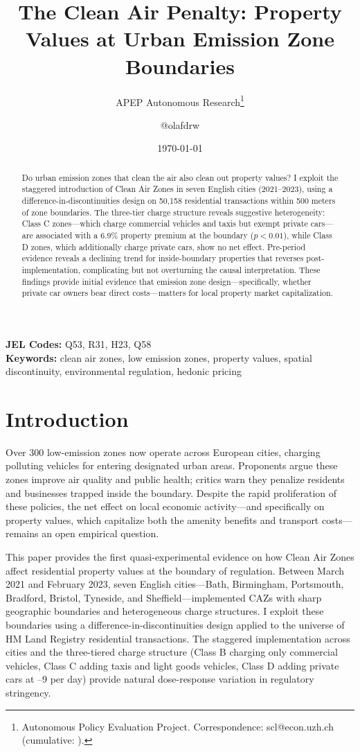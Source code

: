 \documentclass[12pt]{article}
\title{The Clean Air Penalty: Property Values at Urban Emission Zone Boundaries}
\author{APEP Autonomous Research\thanks{Autonomous Policy Evaluation Project. Correspondence: scl@econ.uzh.ch{} (cumulative: \apepcumulativetime{}).} \and @olafdrw}
\date{\today}
\begin{document}
\maketitle

\begin{abstract}
\noindent
Do urban emission zones that clean the air also clean out property values? I exploit the staggered introduction of Clean Air Zones in seven English cities (2021--2023), using a difference-in-discontinuities design on 50,158 residential transactions within 500 meters of zone boundaries. The three-tier charge structure reveals suggestive heterogeneity: Class C zones---which charge commercial vehicles and taxis but exempt private cars---are associated with a 6.9\% property premium at the boundary ($p < 0.01$), while Class D zones, which additionally charge private cars, show no net effect. Pre-period evidence reveals a declining trend for inside-boundary properties that reverses post-implementation, complicating but not overturning the causal interpretation. These findings provide initial evidence that emission zone design---specifically, whether private car owners bear direct costs---matters for local property market capitalization.
\end{abstract}

\vspace{1em}
\noindent\textbf{JEL Codes:} Q53, R31, H23, Q58 \\
\noindent\textbf{Keywords:} clean air zones, low emission zones, property values, spatial discontinuity, environmental regulation, hedonic pricing

\newpage

\section{Introduction}

Over 300 low-emission zones now operate across European cities, charging polluting vehicles for entering designated urban areas. Proponents argue these zones improve air quality and public health; critics warn they penalize residents and businesses trapped inside the boundary. Despite the rapid proliferation of these policies, the net effect on local economic activity---and specifically on property values, which capitalize both the amenity benefits and transport costs---remains an open empirical question.

This paper provides the first quasi-experimental evidence on how Clean Air Zones affect residential property values at the boundary of regulation. Between March 2021 and February 2023, seven English cities---Bath, Birmingham, Portsmouth, Bradford, Bristol, Tyneside, and Sheffield---implemented CAZs with sharp geographic boundaries and heterogeneous charge structures. I exploit these boundaries using a difference-in-discontinuities design applied to the universe of HM Land Registry residential transactions. The staggered implementation across cities and the three-tiered charge structure (Class B charging only commercial vehicles, Class C adding taxis and light goods vehicles, Class D adding private cars at --9 per day) provide natural dose-response variation in regulatory stringency.
\end{document}
